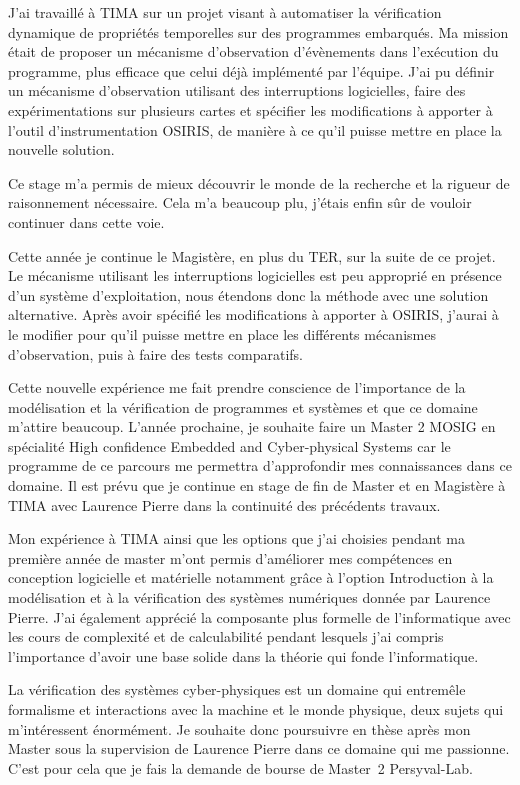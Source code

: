 \documentclass[11pt, a4paper]{awesome-cv} %
\begin{document}
J'ai travaillé à TIMA sur un projet visant à automatiser la
vérification dynamique de propriétés temporelles sur des programmes
embarqués. Ma mission était de proposer un mécanisme d'observation
d'évènements dans l'exécution du programme, plus efficace que celui
déjà implémenté par l'équipe. J'ai pu définir un mécanisme
d'observation utilisant des interruptions logicielles, faire des
expérimentations sur plusieurs cartes et spécifier les modifications
à apporter à l'outil d'instrumentation OSIRIS, de manière à ce qu'il
puisse mettre en place la nouvelle solution.

Ce stage m'a permis de mieux découvrir le monde de la recherche et
la rigueur de raisonnement nécessaire. Cela m'a beaucoup plu,
j'étais enfin sûr de vouloir continuer dans cette voie.

Cette année je continue le Magistère, en plus du TER, sur la suite
de ce projet. Le mécanisme utilisant les interruptions logicielles
est peu approprié en présence d'un système d'exploitation, nous
étendons donc la méthode avec une solution alternative. Après avoir
spécifié les modifications à apporter à OSIRIS, j'aurai à le
modifier pour qu'il puisse mettre en place les différents mécanismes
d'observation, puis à faire des tests comparatifs.

Cette nouvelle expérience me fait prendre conscience de l'importance
de la modélisation et la vérification de programmes et systèmes et
que ce domaine m'attire beaucoup. L'année prochaine, je souhaite
faire un Master 2 MOSIG en spécialité High confidence Embedded and
Cyber-physical Systems car le programme de ce parcours me permettra
d'approfondir mes connaissances dans ce domaine. Il est prévu que je
continue en stage de fin de Master et en Magistère à TIMA avec
Laurence Pierre dans la continuité des précédents travaux.

Mon expérience à TIMA ainsi que les options que j'ai choisies
pendant ma première année de master m'ont permis d'améliorer mes
compétences en conception logicielle et matérielle notamment grâce à
l'option Introduction à la modélisation et à la vérification des
systèmes numériques donnée par Laurence Pierre. J'ai également
apprécié la composante plus formelle de l'informatique avec les
cours de complexité et de calculabilité pendant lesquels j'ai
compris l'importance d'avoir une base solide dans la théorie qui
fonde l'informatique.

La vérification des systèmes cyber-physiques est un domaine qui
entremêle formalisme et interactions avec la machine et le monde
physique, deux sujets qui m'intéressent énormément. Je souhaite donc
poursuivre en thèse après mon Master sous la supervision de Laurence
Pierre dans ce domaine qui me passionne. C'est pour cela que je fais
la demande de bourse de Master~2 Persyval-Lab.
\end{document}
